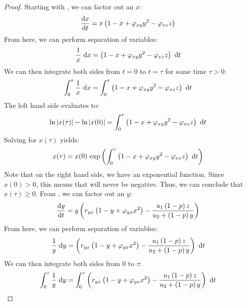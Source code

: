 \begin{proof}
    Starting with , we can factor out an $x$:
    \begin{equation*}
        \diff[]{x}{t} = x\left(1-x+\varphi_{xy}y^2-\varphi_{xz}z\right)
    \end{equation*}
    From here, we can perform separation of variables:
    \begin{equation*}
        \frac{1}{x}\ \mathrm{d}x = \left(1-x+\varphi_{xy}y^2-\varphi_{xz}z\right)\ \mathrm{d}t
    \end{equation*}
    We can then integrate both sides from $t=0$ to $t=\tau$ for some time $\tau>0$:
    \begin{equation*}
        \int_0^\tau \frac{1}{x}\ \opdiff{x} = \int_0^\tau \left(1-x+\varphi_{xy}y^2-\varphi_{xz}z\right)\ \opdiff{t}
    \end{equation*}
    The left hand side evaluates to:
    \begin{equation*}
        \text{ln}\left| x(\tau) \right|-\text{ln}\left| x(0) \right| = \int_0^\tau \left(1-x+\varphi_{xy}y^2-\varphi_{xz}z\right)\ \mathrm{d}t
    \end{equation*}
    Solving for $x(\tau)$ yields:
    \begin{equation*}
        x(\tau) = x(0)\ \text{exp}\left( \int_0^\tau \left(1-x+\varphi_{xy}y^2-\varphi_{xz}z\right)\ \mathrm{d}t \right)
    \end{equation*}
    Note that on the right hand side, we have an exponential function. Since $x(0) > 0$, this means that will never be negative. Thus, we can conclude that $x(\tau) \geq 0$. From , we can factor out an $y$:
    \begin{equation*}
        \diff[]{y}{t} = y\left(r_{yx}\left(1-y+\varphi_{yx}x^2\right)-\frac{u_1\left(1-p\right)z}{u_2+\left(1-p\right)y}\right)
    \end{equation*}
    From here, we can perform separation of variables:
    \begin{equation*}
        \frac{1}{y}\ \opdiff{y} = \left(r_{yx}\left(1-y+\varphi_{yx}x^2\right)-\frac{u_1\left(1-p\right)z}{u_2+\left(1-p\right)y}\right)\ \opdiff{t}
    \end{equation*}
    We can then integrate both sides from 0 to $\tau$:
    \begin{equation*}
        \int_0^\tau \frac{1}{y}\ \opdiff{y} = \int_0^\tau \left(r_{yx}\left(1-y+\varphi_{yx}x^2\right)-\frac{u_1\left(1-p\right)z}{u_2+\left(1-p\right)y}\right)\ \opdiff{t}
    \end{equation*}

\end{proof}
